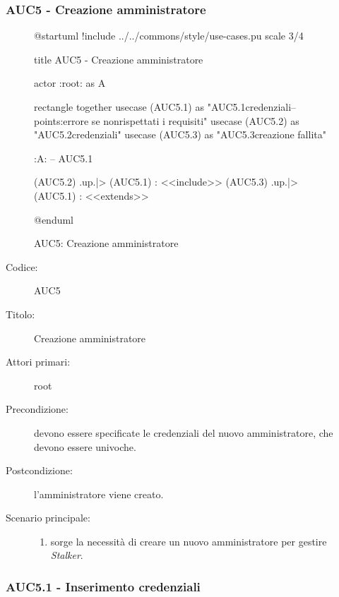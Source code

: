 \documentclass[casi-duso]{subfiles}
\begin{document}
\subsubsection{AUC5 - Creazione amministratore}%
\label{subsub:AUC5}

\begin{figure}[h!] 
  \centering 
  \begin{plantuml}
  @startuml
  !include ../../commons/style/use-cases.pu
  scale 3/4

  title AUC5 - Creazione amministratore

  actor :root: as A

  rectangle {
    together {
      usecase (AUC5.1) as "AUC5.1\nInserimento credenziali\n--\nExtension points:\nvisualizzazione errore se non\nvengono rispettati i requisiti"
      usecase (AUC5.2) as "AUC5.2\nVerifica credenziali"
      usecase (AUC5.3) as "AUC5.3\nVisualizza creazione fallita"
    }
  }

  :A: -- AUC5.1

  (AUC5.2) .up.|> (AUC5.1) : <<include>>
  (AUC5.3) .up.|> (AUC5.1) : <<extends>>

  @enduml
  \end{plantuml} 
  \caption{AUC5: Creazione amministratore} 
  \label{fig:auc5} 
\end{figure}

\begin{description}
  \item[Codice:] AUC5
  \item[Titolo:] Creazione amministratore
  \item[Attori primari:] root
  \item[Precondizione:] devono essere specificate le credenziali del nuovo amministratore, che devono essere univoche.
  \item[Postcondizione:] l'amministratore viene creato.
  \item[Scenario principale:]
  \begin{enumerate}
    \item sorge la necessità di creare un nuovo amministratore per gestire \emph{Stalker}.
  \end{enumerate}
\end{description}


\subsubsection{AUC5.1 - Inserimento credenziali}%
\label{subsub:AUC5.1}
\end{document}
